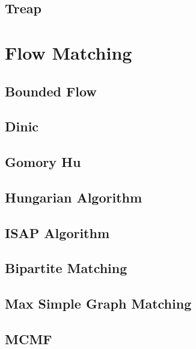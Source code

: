 \documentclass{article}
\begin{document}
\subsection{Treap}


\section{Flow Matching}

\subsection{Bounded Flow}


\subsection{Dinic}


\subsection{Gomory Hu}


\subsection{Hungarian Algorithm}


\subsection{ISAP Algorithm}


\subsection{Bipartite Matching}


\subsection{Max Simple Graph Matching}


\subsection{MCMF}

\end{document}
